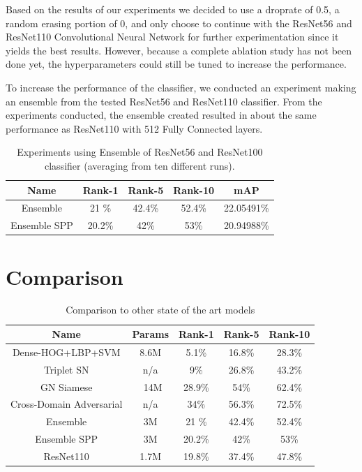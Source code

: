 \documentclass[conference]{IEEEtran}
\begin{document}
	Based on the results of our experiments we decided to use a droprate of 0.5, a random erasing portion of 0, and only choose to continue with the ResNet56 and ResNet110 Convolutional Neural Network for further experimentation since it yields the best results. However, because a complete ablation study has not been done yet, the hyperparameters could still be tuned to increase the performance. 
	
	To increase the performance of the classifier, we conducted an experiment making an ensemble from the tested ResNet56 and ResNet110 classifier. From the experiments conducted, the ensemble created resulted in about the same performance as ResNet110 with 512 Fully Connected layers.
	
	\begin{table}[h!]
		\begin{center}
			\begin{tabular}{|c|c|c|c|c|}
				\hline
				\textbf{Name} & \textbf{Rank-1} & \textbf{Rank-5} & \textbf{Rank-10} & \textbf{mAP} \\ \hline
				Ensemble & 21 \% & 42.4\% & 52.4\% & 22.05491\%\\ \hline
				Ensemble SPP & 20.2\% & 42\% & 53\% & 20.94988\%\\ \hline
			\end{tabular}
		\end{center}
		\vspace{1ex}
		\caption{Experiments using Ensemble of ResNet56 and ResNet100 classifier (averaging from ten different runs).}
		\label{tabel:3}
	\end{table}
	
	\section{Comparison}
	\vspace{1ex}
	
	\begin{table}[h!]
		\begin{center}
			\begin{tabular}{|c|c|c|c|c|}
				\hline
				\textbf{Name} & \textbf{Params} & \textbf{Rank-1} & \textbf{Rank-5} & \textbf{Rank-10} \\ \hline
				Dense-HOG+LBP+SVM & 8.6M & 5.1\% & 16.8\% & 28.3\% \\ \hline
				Triplet SN & n/a & 9\% & 26.8\% & 43.2\% \\ \hline
				GN Siamese & ~14M & 28.9\% & 54\% & 62.4\%\\ \hline
				Cross-Domain Adversarial & n/a & 34\% & 56.3\% & 72.5\%\\ \hline
				Ensemble & 3M & 21 \% & 42.4\% & 52.4\% \\ \hline
                Ensemble SPP & 3M & 20.2\% & 42\% & 53\% \\ \hline
                ResNet110 & 1.7M & 19.8\% & 37.4\% & 47.8\%\\ \hline
			\end{tabular}
		\end{center}
		\vspace{1ex}
		\caption{Comparison to other state of the art models}
		\label{tabel:4}
	\end{table}
	
\end{document}
